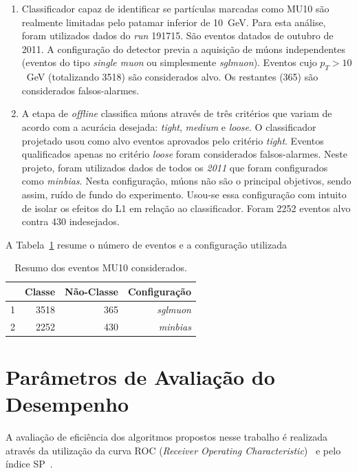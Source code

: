 \begin{enumerate}
    \item Classificador capaz de identificar se partículas marcadas como MU10 são
    realmente limitadas pelo patamar inferior de 10~GeV. Para esta análise, foram
    utilizados dados do \emph{run} 191715. São eventos datados de outubro de 2011. A
    configuração do detector previa a aquisição de múons independentes (eventos do
    tipo \emph{single muon} ou simplesmente \emph{sglmuon}). Eventos cujo $p_T >
    10$~GeV (totalizando 3518) são considerados alvo. Os restantes (365) são
    considerados falsos-alarmes.

    \item A etapa de  \emph{offline }classifica múons através de três critérios
    que variam de acordo com a acurácia desejada: \emph{tight}, \emph{medium} e
    \emph{loose}. O classificador projetado usou como alvo eventos aprovados
    pelo critério \emph{tight}. Eventos qualificados apenas no critério
    \emph{loose} foram considerados falsos-alarmes.  Neste projeto, foram
    utilizados dados de todos os \emph{2011} que foram configurados como
    \emph{minbias}. Nesta configuração, múons não são o principal objetivos,
    sendo assim, ruído de fundo do experimento. Usou-se essa configuração com
    intuito de isolar os efeitos do L1 em  relação ao classificador. Foram 2252
    eventos alvo contra
    430 indesejados.

\end{enumerate}

A Tabela~\ref{table:Classes} resume o número de eventos e a configuração
utilizada

\begin{table}[htbp!]
  \centering
  \begin{tabular}{ l  r  r  r  }
      \toprule
                         & Classe & Não-Classe & Configuração\\
      \midrule
        1 & 3518  & 365 & \emph{sglmuon} \\
        2 & 2252 & 430 &  \emph{minbias} \\ 
      \bottomrule
  \end{tabular}
  \caption{Resumo dos eventos MU10 considerados.}
  \label{table:Classes}

\end{table}



\section{Parâmetros de Avaliação do Desempenho}
\label{sec:performance_indexes}
A avaliação de eficiência dos algoritmos propostos nesse trabalho é realizada
através da utilização da curva ROC (\emph{Receiver Operating
Characteristic})~\cite{TREES2001} e pelo índice SP~\cite{ref:SIMAS}.

